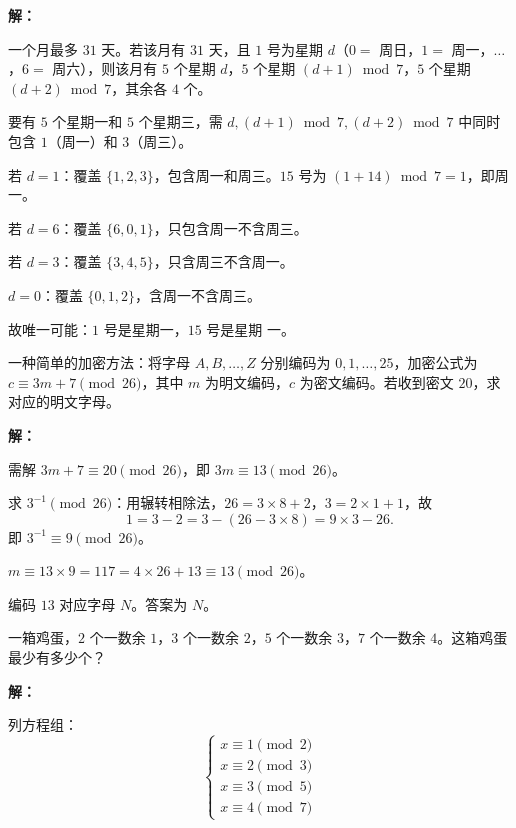 \documentclass[12pt, a4paper]{ctexart}
\begin{document}
\textbf{解：}

一个月最多 $31$ 天。若该月有 $31$ 天，且 $1$ 号为星期 $d$（$0=$ 周日，$1=$ 周一，$\ldots$，$6=$ 周六），则该月有 $5$ 个星期 $d$，$5$ 个星期 $(d+1) \bmod 7$，$5$ 个星期 $(d+2) \bmod 7$，其余各 $4$ 个。

要有 $5$ 个星期一和 $5$ 个星期三，需 $d, (d+1) \bmod 7, (d+2) \bmod 7$ 中同时包含 $1$（周一）和 $3$（周三）。

若 $d = 1$：覆盖 $\{1, 2, 3\}$，包含周一和周三。$15$ 号为 $(1 + 14) \bmod 7 = 1$，即周一。

若 $d = 6$：覆盖 $\{6, 0, 1\}$，只包含周一不含周三。

若 $d = 3$：覆盖 $\{3, 4, 5\}$，只含周三不含周一。

$d = 0$：覆盖 $\{0, 1, 2\}$，含周一不含周三。

故唯一可能：$1$ 号是星期一，$15$ 号是星期 $\boxed{\text{一}}$。

\begin{appbox}[【应用2】密码学中的模运算]
一种简单的加密方法：将字母 $A, B, \ldots, Z$ 分别编码为 $0, 1, \ldots, 25$，加密公式为 $c \equiv 3m + 7 \pmod{26}$，其中 $m$ 为明文编码，$c$ 为密文编码。若收到密文 $20$，求对应的明文字母。
\end{appbox}

\textbf{解：}

需解 $3m + 7 \equiv 20 \pmod{26}$，即 $3m \equiv 13 \pmod{26}$。

求 $3^{-1} \pmod{26}$：用辗转相除法，$26 = 3 \times 8 + 2$，$3 = 2 \times 1 + 1$，故
\[ 1 = 3 - 2 = 3 - (26 - 3 \times 8) = 9 \times 3 - 26. \]
即 $3^{-1} \equiv 9 \pmod{26}$。

$m \equiv 13 \times 9 = 117 = 4 \times 26 + 13 \equiv 13 \pmod{26}$。

编码 $13$ 对应字母 $N$。答案为 $\boxed{N}$。

\begin{appbox}
一箱鸡蛋，$2$ 个一数余 $1$，$3$ 个一数余 $2$，$5$ 个一数余 $3$，$7$ 个一数余 $4$。这箱鸡蛋最少有多少个？
\end{appbox}

\textbf{解：}

列方程组：
\[
\begin{cases}
x \equiv 1 \pmod{2} \\
x \equiv 2 \pmod{3} \\
x \equiv 3 \pmod{5} \\
x \equiv 4 \pmod{7}
\end{cases}
\]
\end{document}
